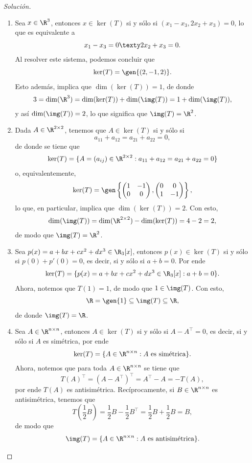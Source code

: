 \documentclass[a4,11pt]{aleph-notas}
\begin{document}
\begin{proof}[Solución]\hspace{0pt}
\begin{enumerate}
    \item Sea $x\in\R^3$, entonces $x\in\ker(T)$ si y sólo si $(x_1-x_3,2x_2+x_3) = 0$, lo que es equivalente a 
    \[
        x_1 - x_3 = 0 \texty 2x_2 + x_3 = 0.
    \]
    Al resolver este sistema, podemos concluir que
    \[
        \ker(T) = \gen\{(2,-1,2)\}.
    \]
    Esto además, implica que $\dim(\ker(T)) = 1$, de donde
    \[
        3 = \dim(\R^3) = \dim(\ker(T)) + \dim(\img(T)) = 1 + \dim(\img(T)),
    \]
    y así $\dim(\img(T)) = 2$, lo que significa que $\img(T)=\R^2$.
    
    \item Dada $A\in\R^{2\times 2}$, tenemos que $A\in\ker(T)$ si y sólo si 
    \[
        a_{11}+a_{12} = a_{21} + a_{22} = 0,
    \]
    de donde se tiene que
    \[
        \ker(T) = \{A=(a_{ij})\in\R^{2\times 2} :  a_{11}+a_{12} = a_{21} + a_{22} = 0\}
    \]
    o, equivalentemente,
    \[
        \ker(T) = \gen\left\{ \begin{pmatrix}
                    1 & -1 \\ 0 & 0
        \end{pmatrix}, \begin{pmatrix}
                    0 & 0 \\ 1 & -1
        \end{pmatrix} \right\},
    \]
    lo que, en particular, implica que $\dim(\ker(T)) = 2$. Con esto,
    \[
        \dim(\img(T)) = \dim(\R^{2\times 2}) - \dim(\ker(T)) = 4 - 2 = 2,
    \]
    de modo que $\img(T) = \R^2$.
    
    \item Sea $p(x)=a+bx+cx^2+dx^3\in\R_3[x]$, entonces $p(x)\in \ker(T)$ si y sólo si $p(0)+p'(0)=0$, es decir, si y sólo si $a+b=0$. Por ende
    \[
        \ker(T) = \{ p(x)=a+bx+cx^2+dx^3\in\R_3[x] : a+b = 0 \}.
    \]
    Ahora, notemos que $T(1) = 1$, de modo que $1\in\img(T)$. Con esto,
    \[
        \R = \gen\{1\}\subseteq \img(T) \subseteq\R,
    \]
    de donde $\img(T) = \R$.
    
    \item Sea $A\in\R^{n\times n}$, entonces $A\in\ker(T)$ si y sólo si $A-A^\intercal = 0$, es decir, si y sólo si $A$ es simétrica, por ende
    \[
        \ker(T) = \{A\in\R^{n\times n} : A\text{ es simétrica}\}.
    \]
    Ahora, notemos que para toda $A\in\R^{n\times n}$ se tiene que
    \[
        T(A)^\intercal = (A-A^\intercal)^{\intercal} = A^\intercal - A = -T(A),
    \]
    por ende $T(A)$ es antisimétrica. Recíprocamente, si $B\in\R^{n\times n} $ es antisimétrica, tenemos que
    \[
        T\left( \frac{1}{2}B \right) =  \frac{1}{2}B -  \frac{1}{2}B^\intercal =  \frac{1}{2}B +  \frac{1}{2}B = B,
    \]
    de modo que 
    \[
        \img(T) = \{A\in\R^{n\times n} : A \text{ es antisimétrica}\}.
    \]  
    

\end{enumerate}
\end{proof}
\end{document}

